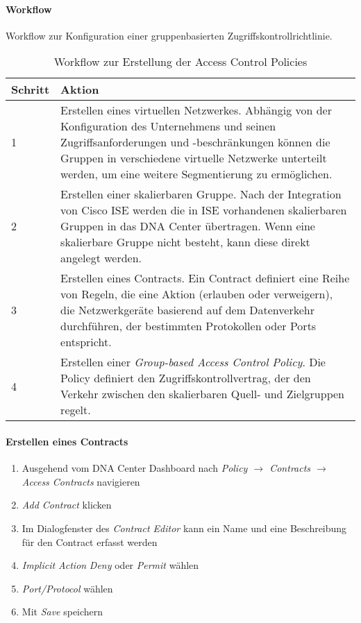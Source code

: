 \paragraph{Workflow}
Workflow zur Konfiguration einer gruppenbasierten Zugriffskontrollrichtlinie.

\begin{table}[H]
	\centering
	\begin{tabularx}{\textwidth}{| p{2 cm} | X |}
		\rowcolor{gray!50}
		\hline
		\textbf{Schritt} & \textbf{Aktion}  \\
		\hline	
		1 & Erstellen eines virtuellen Netzwerkes. Abhängig von der Konfiguration des Unternehmens und seinen Zugriffsanforderungen und -beschränkungen können die Gruppen in verschiedene virtuelle Netzwerke unterteilt werden, um eine weitere Segmentierung zu ermöglichen. \\
		\hline
		2 & Erstellen einer skalierbaren Gruppe. Nach der Integration von Cisco ISE werden die in ISE vorhandenen skalierbaren Gruppen in das DNA Center übertragen. Wenn eine skalierbare Gruppe nicht besteht, kann diese direkt angelegt werden. \\
		\hline
		3 & Erstellen eines Contracts. Ein Contract definiert eine Reihe von Regeln, die eine Aktion (erlauben oder verweigern), die Netzwerkgeräte basierend auf dem Datenverkehr durchführen, der bestimmten Protokollen oder Ports entspricht.  \\
		\hline
		4 & Erstellen einer \textit{Group-based Access Control Policy}. Die Policy definiert den Zugriffskontrollvertrag, der den Verkehr zwischen den skalierbaren Quell- und Zielgruppen regelt. \\
		\hline
	\end{tabularx}
	\caption{Workflow zur Erstellung der Access Control Policies}
	\label{tab:Workflow zur Erstellung der Access Control Policies}
\end{table}

\paragraph{Erstellen eines Contracts}
\begin{enumerate}
	\item Ausgehend vom DNA Center Dashboard nach \textit{Policy $\rightarrow$ Contracts $\rightarrow$ Access Contracts} navigieren
	\item \textit{Add Contract} klicken
	\item Im Dialogfenster des \textit{Contract Editor} kann ein Name und eine Beschreibung für den Contract erfasst werden
	\item \textit{Implicit Action} \textit{Deny} oder \textit{Permit} wählen
	\item \textit{Port/Protocol} wählen
	\item Mit \textit{Save} speichern
\end{enumerate}

